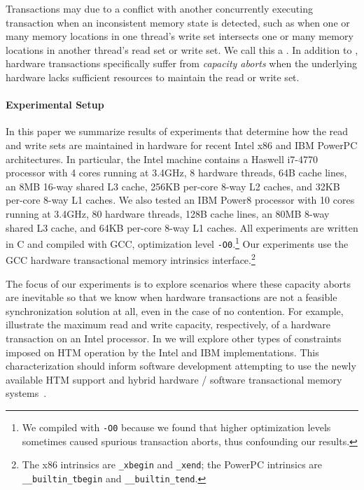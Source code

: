 Transactions may  due to a conflict with
another concurrently executing transaction when an
inconsistent memory state is detected, 
such as when one or many memory locations
in one thread's write set intersects one or 
many memory locations in another
thread's read set or write set.  We call this a
.  In addition to ,
hardware transactions specifically suffer 
from \textit{capacity aborts} when the underlying hardware
lacks sufficient resources to maintain the
read or write set.

\paragraph{Experimental Setup}
In this paper we summarize results of experiments 
that determine how the
read and write sets are maintained in hardware for recent 
Intel x86 and IBM PowerPC architectures. In particular,
the Intel machine contains a Haswell i7-4770 processor with 4
cores running at 3.4GHz, 8 hardware threads, 64B cache lines, an 8MB
16-way shared L3 cache, 256KB per-core 8-way L2 caches, 
and 32KB per-core 8-way L1 caches.
We also tested an IBM Power8 processor with 10 cores running at 3.4GHz,
80 hardware threads, 128B cache lines, an 80MB 8-way
shared L3 cache, and 64KB per-core 8-way L1 caches.
All experiments are written in C and compiled with GCC, 
optimization level
\texttt{-O0}.\footnote{We compiled with \texttt{-O0} because
we found that higher optimization levels sometimes 
caused spurious transaction
aborts, thus confounding our results.} Our experiments use the GCC
hardware transactional memory intrinsics interface.\footnote{The x86
intrinsics are \texttt{\_xbegin} and \texttt{\_xend}; 
the PowerPC intrinsics are
\texttt{\_\_builtin\_tbegin} and \texttt{\_\_builtin\_tend}.}

The focus of our experiments is to explore scenarios where these
capacity aborts are inevitable so that we know 
when hardware transactions are
not a feasible synchronization solution at all, 
even in the case of no contention. For example, 
illustrate the maximum read and write capacity, respectively,
of a hardware transaction on an Intel processor.  In 
we will explore other types of constraints imposed on
HTM operation by the Intel and IBM implementations.
This characterization should inform
software development attempting to use the newly available HTM support 
and hybrid hardware / software transactional memory
systems~\cite{DamronFeLe06,MatveevSh13}.
